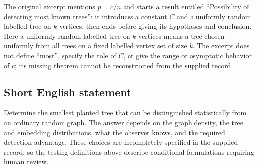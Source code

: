 \documentclass[11pt]{article}
\begin{document}
The original excerpt mentions \(p=c/n\) and starts a result entitled ``Possibility of detecting most known trees'': it introduces a constant \(C\) and a uniformly random labelled tree on \(k\) vertices, then ends before giving its hypotheses and conclusion. Here a uniformly random labelled tree on \(k\) vertices means a tree chosen uniformly from all trees on a fixed labelled vertex set of size \(k\). The excerpt does not define ``most'', specify the role of \(C\), or give the range or asymptotic behavior of \(c\); its missing theorem cannot be reconstructed from the supplied record.
\subsection{Short English statement}
Determine the smallest planted tree that can be distinguished statistically from an ordinary random graph. The answer depends on the graph density, the tree and embedding distributions, what the observer knows, and the required detection advantage. These choices are incompletely specified in the supplied record, so the testing definitions above describe conditional formulations requiring human review.
\end{document}
